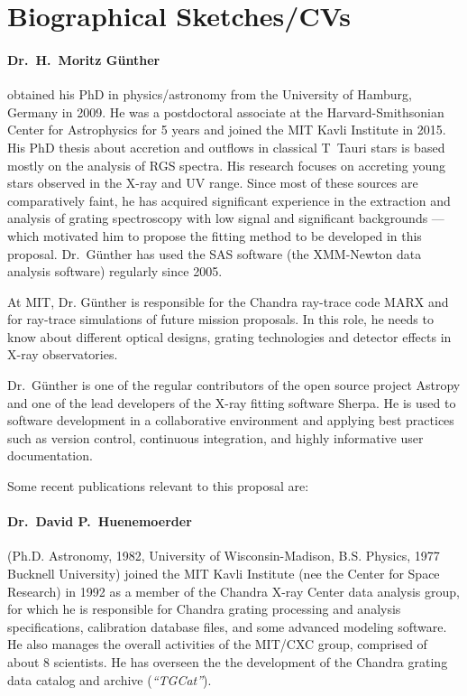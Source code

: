 \documentclass[fleqn,12pt,onecolumn]{SelfArx} %
\begin{document}
\section{Biographical Sketches/CVs}
\paragraph{Dr.\ H.\ Moritz G\"unther} obtained his PhD in physics/astronomy from the
University of Hamburg, Germany in 2009. He was a postdoctoral
associate at the Harvard-Smithsonian Center for Astrophysics for 5
years and joined the MIT Kavli Institute in 2015. His PhD thesis about
accretion and outflows in classical T~Tauri stars is based mostly on
the analysis of RGS spectra. His research focuses on accreting young
stars observed in the X-ray and UV range. Since most of these sources
are comparatively faint, he has acquired significant experience in the
extraction and analysis of grating spectroscopy with low signal and
significant backgrounds --- which motivated him to propose the fitting method to be developed in this proposal. Dr.\ G\"unther has used the SAS software (the
XMM-Newton data analysis software) regularly since 2005.

At MIT, Dr. G\"unther is responsible for the Chandra ray-trace code
MARX and for ray-trace simulations of future mission proposals. In
this role, he needs to know about different optical designs, grating
technologies and detector effects in X-ray observatories.

Dr.\ G\"unther is one of the regular contributors of the open source
project Astropy and one of the lead developers of the X-ray fitting software Sherpa. He is used to software development in a collaborative
environment and applying best practices such as version control,
continuous integration, and highly informative user documentation.

Some recent publications relevant to this proposal are:
\bibsep -0.25mm
\renewcommand{\bibsection}{\relax}
\begin{thebibliography}{1}
{%

}
\end{thebibliography}

\paragraph{Dr.\ David P.\ Huenemoerder} (Ph.D. Astronomy, 1982,
University of Wisconsin-Madison, B.S. Physics, 1977 Bucknell
University) joined the MIT Kavli Institute (nee the Center
for Space Research) in 1992 as a member of the Chandra X-ray Center data
analysis group, for which he is responsible for Chandra grating
processing and analysis specifications, calibration database files,
and some advanced modeling software.  He also manages the overall
activities of the MIT/CXC group, comprised of about 8 scientists.  He
has overseen the the development of the Chandra grating data catalog and
archive ({\em ``TGCat''}).
\end{document}
